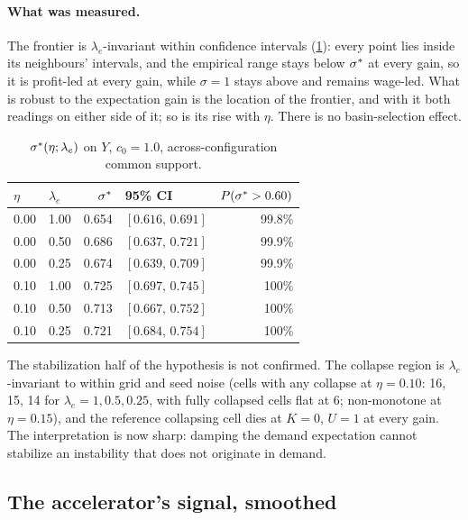 \paragraph{What was measured.} The frontier is $\lambda_e$-invariant within
confidence intervals (\cref{tab:expectations}): every point lies inside its
neighbours' intervals, and the empirical range stays below $\sigma^{\ast}$ at every
gain, so it is profit-led at every gain, while $\sigma = 1$ stays above and
remains wage-led. What is robust to the expectation gain is the location
of the frontier, and with it both readings on either side of it; so is its rise
with $\eta$. There is no basin-selection effect.

\begin{table}[htbp]
\centering
\small
\caption{$\sigma^{\ast}(\eta;\lambda_e)$ on $Y$, $c_0 = 1.0$, across-configuration
common support.}
\label{tab:expectations}
\begin{tabular}{llrlr}
\toprule
$\eta$ & $\lambda_e$ & $\sigma^{\ast}$ & 95\% CI & $P(\sigma^{\ast} > 0.60)$\\
\midrule
0.00 & 1.00 & 0.654 & $[0.616,\,0.691]$ & 99.8\%\\
0.00 & 0.50 & 0.686 & $[0.637,\,0.721]$ & 99.9\%\\
0.00 & 0.25 & 0.674 & $[0.639,\,0.709]$ & 99.9\%\\
0.10 & 1.00 & 0.725 & $[0.697,\,0.745]$ & 100\%\\
0.10 & 0.50 & 0.713 & $[0.667,\,0.752]$ & 100\%\\
0.10 & 0.25 & 0.721 & $[0.684,\,0.754]$ & 100\%\\
\bottomrule
\end{tabular}
\end{table}

The stabilization half of the hypothesis is not confirmed. The
collapse region is $\lambda_e$-invariant to within grid and seed noise (cells
with any collapse at $\eta = 0.10$: 16, 15, 14 for $\lambda_e = 1, 0.5, 0.25$,
with fully collapsed cells flat at 6; non-monotone at $\eta = 0.15$), and the
reference collapsing cell dies at $K = 0$, $U = 1$ at every gain. The
interpretation is now sharp: damping the demand expectation cannot
stabilize an instability that does not originate in demand.

\subsection{The accelerator's signal, smoothed}
\label{sec:invexpectations}

